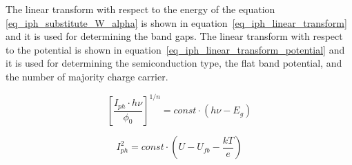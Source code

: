 The linear transform with respect to the energy of the 
equation \ref{eq_iph_substitute_W_alpha} is shown in 
equation~\ref{eq_iph_linear_transform} and it is used for determining 
the band gaps. 
The linear transform with respect to the potential is shown in 
equation~\ref{eq_iph_linear_transform_potential} and it is used for determining 
the semiconduction type, the flat band potential, 
and the number of majority charge carrier.


\begin{equation}
    \left[ \frac{I_{ph} \cdot h\nu}{\phi _0} \right] ^{1/n} = const \cdot (h\nu - E_g)
    \label{eq_iph_linear_transform}
\end{equation}

    \begin{equation}
    I_{ph}^2 = const \cdot (U-U_{fb}-\frac{kT}{e})
    \label{eq_iph_linear_transform_potential}
\end{equation}

